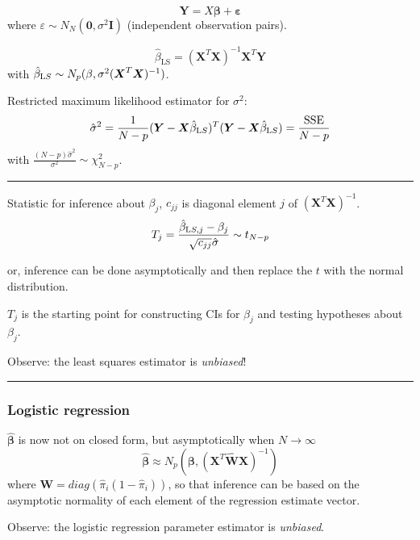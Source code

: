 \documentclass[
  letterpaper,
  DIV=11,
  numbers=noendperiod]{scrartcl}
\begin{document}
\[{\boldsymbol Y=X \boldsymbol{\beta}}+{\boldsymbol \varepsilon}\] where
\(\varepsilon\sim N_N({\boldsymbol 0},\sigma^2{\boldsymbol I})\)
(independent observation pairs).

\[\hat{\beta}_{\text{LS}}=({\boldsymbol X}^T{\boldsymbol X})^{-1} {\boldsymbol X}^T {\boldsymbol Y}\]
with
\(\hat{\beta}_{\text LS}\sim N_{p}(\beta,\sigma^2({\boldsymbol X}^T{\boldsymbol X})^{-1})\).

Restricted maximum likelihood estimator for \(\sigma^2\):
\[\hat{\sigma}^2=\frac{1}{N-p}({\boldsymbol Y}-{\boldsymbol X}\hat{\beta}_{\text LS})^T({\boldsymbol Y}-{\boldsymbol X}\hat{\beta}_{\text LS})=\frac{\text{SSE}}{N-p}\]
with \(\frac{(N-p)\hat{\sigma}^2}{\sigma^2} \sim \chi^2_{N-p}\).

\begin{center}\rule{0.5\linewidth}{0.5pt}\end{center}

Statistic for inference about \(\beta_j\), \(c_{jj}\) is diagonal
element \(j\) of \(({\boldsymbol X}^T{\boldsymbol X})^{-1}\).
\[T_j=\frac{\hat{\beta}_{\text LS,j}-\beta_j}{\sqrt{c_{jj}}\hat{\sigma}}\sim t_{N-p}\]

or, inference can be done asymptotically and then replace the \(t\) with
the normal distribution.

\(T_j\) is the starting point for constructing CIs for \(\beta_j\) and
testing hypotheses about \(\beta_j\).

Observe: the least squares estimator is \emph{unbiased}!

\begin{center}\rule{0.5\linewidth}{0.5pt}\end{center}

\hypertarget{logistic-regression}{%
\subsubsection{Logistic regression}\label{logistic-regression}}

\(\hat{\boldsymbol{\beta}}\) is now not on closed form, but
asymptotically when \(N \rightarrow \infty\)
\[\hat{\boldsymbol\beta} \approx N_{p}(\boldsymbol\beta,(\boldsymbol X^T\hat{\boldsymbol{W}}\boldsymbol X)^{-1})\]
where \(\boldsymbol W=diag(\hat{\pi}_i(1-\hat{\pi}_i))\), so that
inference can be based on the asymptotic normality of each element of
the regression estimate vector.

Observe: the logistic regression parameter estimator is \emph{unbiased}.
\end{document}
